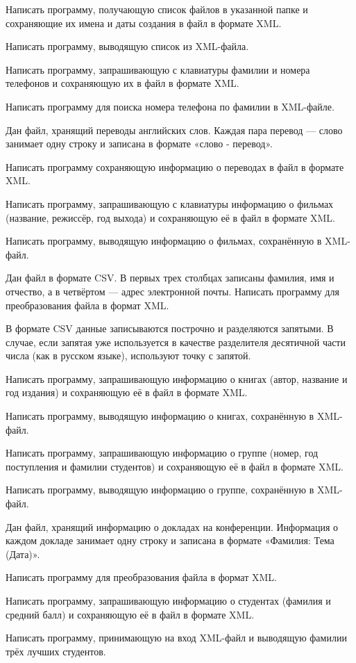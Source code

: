 \task Написать программу, получающую список файлов в указанной папке и
сохраняющие их имена и даты создания в файл в формате XML.

Написать программу, выводящую список из XML-файла.

\task Написать программу, запрашивающую с клавиатуры фамилии и номера
телефонов и сохраняющую их в файл в формате XML.

Написать программу для поиска номера телефона по фамилии в XML-файле.

\task Дан файл, хранящий переводы английских слов. Каждая пара перевод
— слово занимает одну строку и записана в формате «слово - перевод».

Написать программу сохраняющую информацию о переводах в файл в формате
XML.

\task Написать программу, запрашивающую с клавиатуры информацию о
фильмах (название, режиссёр, год выхода) и сохраняющую её в файл в
формате XML.

Написать программу, выводящую информацию о фильмах, сохранённую в
XML-файл.

\task Дан файл в формате CSV. В первых трех столбцах записаны фамилия,
имя и отчество, а в четвёртом — адрес электронной почты. Написать
программу для преобразования файла в формат XML.

В формате CSV данные записываются построчно и разделяются запятыми. В
случае, если запятая уже используется в качестве разделителя десятичной
части числа (как в русском языке), используют точку с запятой.

\task Написать программу, запрашивающую информацию о книгах (автор,
название и год издания) и сохраняющую её в файл в формате
XML.

Написать программу, выводящую информацию о книгах, сохранённую в
XML-файл.

\task Написать программу, запрашивающую информацию о группе (номер,
год поступления и фамилии студентов) и сохраняющую её в файл в формате
XML.

Написать программу, выводящую информацию о группе, сохранённую в
XML-файл.

\task Дан файл, хранящий информацию о докладах на
конференции. Информация о каждом докладе занимает одну строку и
записана в формате «Фамилия: Тема (Дата)».

Написать программу для преобразования файла в формат XML.

\task Написать программу, запрашивающую информацию о студентах
(фамилия и средний балл) и сохраняющую её в файл в формате XML.

Написать программу, принимающую на вход XML-файл и выводящую фамилии
трёх лучших студентов.
